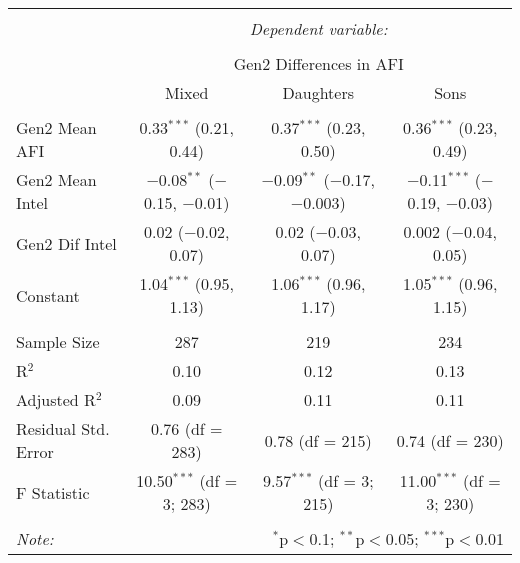 
\begingroup 
\small 
\begin{tabular}{@{\extracolsep{1pt}}lccc} 
\\[-1.8ex]\hline 
\hline \\[-1.8ex] 
 & \multicolumn{3}{c}{\textit{Dependent variable:}} \\ 
\cline{2-4} 
\\[-1.8ex] & \multicolumn{3}{c}{Gen2 Differences in AFI} \\ 
 & Mixed & Daughters & Sons \\ 
\hline \\[-1.8ex] 
 Gen2 Mean AFI & 0.33$^{***}$ (0.21, 0.44) & 0.37$^{***}$ (0.23, 0.50) & 0.36$^{***}$ (0.23, 0.49) \\ 
  Gen2 Mean Intel & $-$0.08$^{**}$ ($-$0.15, $-$0.01) & $-$0.09$^{**}$ ($-$0.17, $-$0.003) & $-$0.11$^{***}$ ($-$0.19, $-$0.03) \\ 
  Gen2 Dif Intel & 0.02 ($-$0.02, 0.07) & 0.02 ($-$0.03, 0.07) & 0.002 ($-$0.04, 0.05) \\ 
  Constant & 1.04$^{***}$ (0.95, 1.13) & 1.06$^{***}$ (0.96, 1.17) & 1.05$^{***}$ (0.96, 1.15) \\ 
 \hline \\[-1.8ex] 
Sample Size & 287 & 219 & 234 \\ 
R$^{2}$ & 0.10 & 0.12 & 0.13 \\ 
Adjusted R$^{2}$ & 0.09 & 0.11 & 0.11 \\ 
Residual Std. Error & 0.76 (df = 283) & 0.78 (df = 215) & 0.74 (df = 230) \\ 
F Statistic & 10.50$^{***}$ (df = 3; 283) & 9.57$^{***}$ (df = 3; 215) & 11.00$^{***}$ (df = 3; 230) \\ 
\hline 
\hline \\[-1.8ex] 
\textit{Note:}  & \multicolumn{3}{r}{$^{*}$p$<$0.1; $^{**}$p$<$0.05; $^{***}$p$<$0.01} \\ 
\end{tabular} 
\endgroup 
